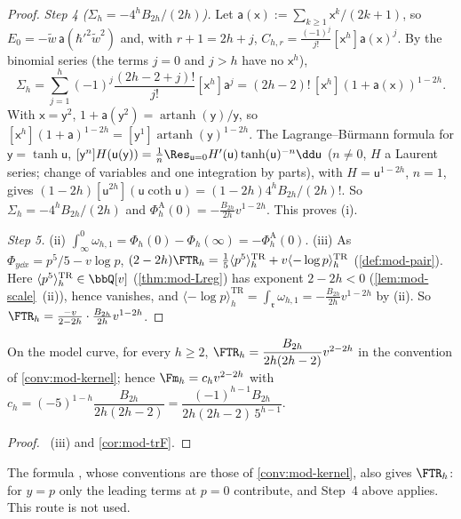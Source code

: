 \begin{proof}
\emph{Step 4 ($\Sigma_h=-4^hB_{2h}/(2h)$).} Let $\mathsf a(\mathsf x):=\sum_{k\geq 1}\mathsf x^k/(2k+1)$, so $E_0=-\tilde w\,\mathsf a(\hbar'^2\tilde w^2)$ and, with $r+1=2h+j$, $C_{h,r}=\frac{(-1)^j}{j!}[\mathsf x^h]\mathsf a(\mathsf x)^j$. By the binomial series (the terms $j=0$ and $j>h$ have no $\mathsf x^h$),
\[
\Sigma_h=\sum_{j=1}^h(-1)^j\frac{(2h-2+j)!}{j!}[\mathsf x^h]\mathsf a^j=(2h-2)!\,[\mathsf x^h](1+\mathsf a(\mathsf x))^{1-2h}.
\]
With $\mathsf x=\mathsf y^2$, $1+\mathsf a(\mathsf y^2)=\operatorname{artanh}(\mathsf y)/\mathsf y$, so $[\mathsf x^h](1+\mathsf a)^{1-2h}=[\mathsf y^{1}]\operatorname{artanh}(\mathsf y)^{1-2h}$. The Lagrange--B\"urmann formula for $\mathsf y=\tanh\mathsf u$, $[\mathsf y^n]H(\mathsf u(\mathsf y))=\frac1n\Res_{\mathsf u=0}H'(\mathsf u)\tanh(\mathsf u)^{-n}\dd\mathsf u$ ($n\neq 0$, $H$ a Laurent series; change of variables and one integration by parts), with $H=\mathsf u^{1-2h}$, $n=1$, gives $(1-2h)[\mathsf u^{2h}](\mathsf u\coth\mathsf u)=(1-2h)4^hB_{2h}/(2h)!$. So $\Sigma_h=-4^hB_{2h}/(2h)$ and $\Phi^{\mathrm A}_h(0)=-\frac{B_{2h}}{2h}v^{1-2h}$. This proves (i).

\emph{Step 5.} (ii) $\int_\infty^0\omega_{h,1}=\Phi_h(0)-\Phi_h(\infty)=-\Phi^{\mathrm A}_h(0)$. (iii) As $\Phi_{y\dd x}=p^5/5-v\log p$, $(2-2h)\FTR_h=\frac15\langle p^5\rangle^{\mathrm{TR}}_h+v\langle-\log p\rangle^{\mathrm{TR}}_h$ (\cref{def:mod-pair}). Here $\langle p^5\rangle^{\mathrm{TR}}_h\in\bbQ[v]$ (\cref{thm:mod-Lreg}) has exponent $2-2h<0$ (\cref{lem:mod-scale}~(ii)), hence vanishes, and $\langle-\log p\rangle^{\mathrm{TR}}_h=\int_{\mathfrak r}\omega_{h,1}=-\frac{B_{2h}}{2h}v^{1-2h}$ by (ii). So $\FTR_h=\frac{-v}{2-2h}\cdot\frac{B_{2h}}{2h}v^{1-2h}$.
\end{proof}

\begin{thm}
\label{thm:mod-gap}
On the model curve, for every $h\geq 2$, $\FTR_h=\dfrac{B_{2h}}{2h(2h-2)}v^{2-2h}$ in the convention of \cref{conv:mod-kernel}; hence $\Fm_h=c_hv^{2-2h}$ with $c_h=(-5)^{1-h}\dfrac{B_{2h}}{2h(2h-2)}=\dfrac{(-1)^{h-1}B_{2h}}{2h(2h-2)\,5^{h-1}}$.
\end{thm}

\begin{proof}
~(iii) and \cref{cor:mod-trF}.
\end{proof}

\begin{rmk}
\label{rmk:mod-hock}
The formula \cite[Cor.~1.2, (1.3)]{Hock25}, whose conventions \cite[(2.1), (1.1)]{Hock25} are those of \cref{conv:mod-kernel}, also gives $\FTR_h$: for $y=p$ only the leading terms at $p=0$ contribute, and Step~4 above applies. This route is not used. 
\end{rmk}


